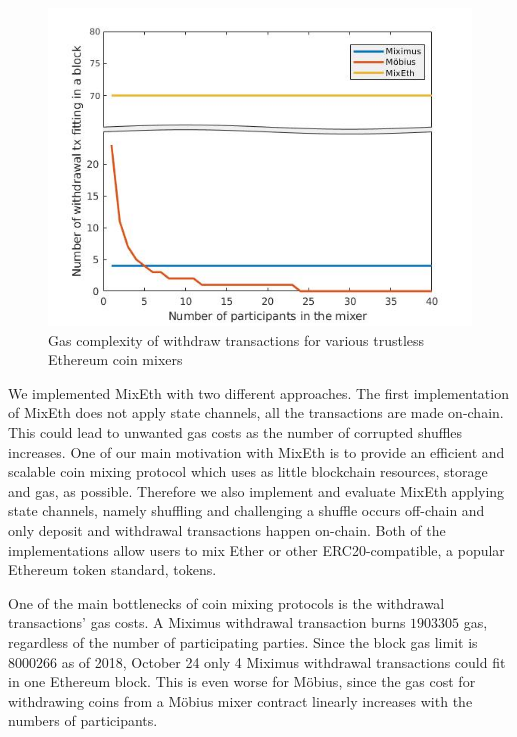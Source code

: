 \documentclass[a4paper]{article}
\theoremstyle{definition}
\begin{document}
\begin{figure}
	\centering
	\includegraphics[scale=0.7]{./withdrawalComplexity.jpg}
	\captionsetup{justification=centering}
	\caption{Gas complexity of withdraw transactions for various trustless Ethereum coin mixers}
\end{figure} 

We implemented MixEth with two different approaches. The first implementation of MixEth does not apply state channels, all the transactions are made on-chain. This could lead to unwanted gas costs as the number of corrupted shuffles increases. One of our main motivation with MixEth is to provide an efficient and scalable coin mixing protocol which uses as little blockchain resources, storage and gas, as possible. Therefore we also implement and evaluate MixEth applying state channels, namely shuffling and challenging a shuffle occurs off-chain and only deposit and withdrawal transactions happen on-chain.
Both of the implementations allow users to mix Ether or other ERC20-compatible, a popular Ethereum token standard, tokens.

One of the main bottlenecks of coin mixing protocols is the withdrawal transactions' gas costs. A Miximus withdrawal transaction burns $\num[group-separator={,}]{1903305}$ gas, regardless of the number of participating parties. Since the block gas limit is $\num[group-separator={,}]{8000266}$ as of 2018, October 24 only 4 Miximus withdrawal transactions could fit in one Ethereum block. This is even worse for Möbius, since the gas cost for withdrawing coins from a Möbius mixer contract linearly increases with the numbers of participants.
\end{document}
